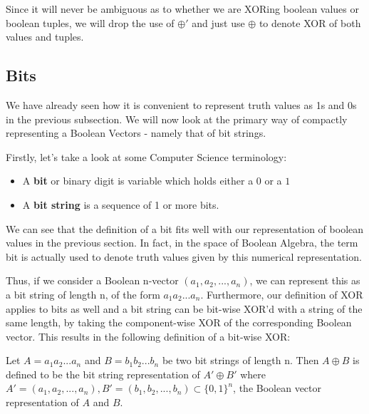 \begin{rem}
Since it will never be ambiguous as to whether we are XORing boolean
values or boolean tuples, we will drop the use of $\oplus'$ and just
use $\oplus$ to denote XOR of both values and tuples.
\end{rem}

\subsection{Bits}
We have already seen how it is convenient to represent truth values as 1s
and 0s in the previous subsection. We will now look at the primary way of
compactly representing a Boolean Vectors - namely that of bit strings.

Firstly, let's take a look at some Computer Science terminology:
\begin{itemize}
\item A \textbf{bit} or binary digit is variable which holds either a $0$ or a $1$
\item A \textbf{bit string} is a sequence of 1 or more bits.
\end{itemize}

We can see that the definition of a bit fits well with our representation of
boolean values in the previous section. In fact, in the space of Boolean
Algebra, the term bit is actually used to denote truth values given by this 
numerical representation.

Thus, if we consider a Boolean n-vector $(a_1, a_2, ..., a_n)$, we
can represent this as a bit string of length n, of the form $a_1a_2...a_n$.
Furthermore, our definition of XOR applies to bits as well and a bit string can
be bit-wise XOR'd with a string of the same length, by taking the
component-wise XOR of the corresponding Boolean vector. This results in the
following definition of a bit-wise XOR:

\begin{defn}
Let $A = a_1a_2...a_n$ and $B = b_1b_2...b_n$ be two bit strings of length n. 
Then $A \oplus B$ is defined to be the bit string representation of 
$A' \oplus B'$ where $A' = (a_1, a_2, ..., a_n), B' = (b_1, b_2, ..., b_n) \subset \{0,1\}^n$,
the Boolean vector representation of $A$ and $B$.

\end{defn}


